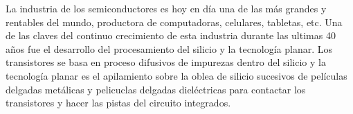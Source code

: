 


		La industria de los semiconductores es hoy en día una de las más grandes y rentables del mundo, productora de computadoras, celulares, tabletas, etc. Una de las claves del continuo crecimiento de esta industria durante las ultimas 40 años fue el desarrollo del procesamiento del silicio y la tecnología planar. Los transistores se basa en proceso difusivos de impurezas dentro del silicio y la tecnología planar es el apilamiento sobre la oblea de silicio sucesivos de películas delgadas metálicas y  pelicuclas delgadas dieléctricas para contactar los transistores y hacer las pistas del circuito integrados. 






